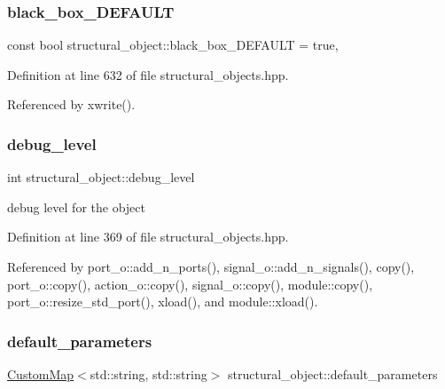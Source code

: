 \subsubsection{\texorpdfstring{black\+\_\+box\+\_\+\+D\+E\+F\+A\+U\+LT}{black\_box\_DEFAULT}}
{\footnotesize\ttfamily const bool structural\+\_\+object\+::black\+\_\+box\+\_\+\+D\+E\+F\+A\+U\+LT = true\hspace{0.3cm}{\ttfamily [static]}, {\ttfamily [private]}}



Definition at line 632 of file structural\+\_\+objects.\+hpp.



Referenced by xwrite().

\mbox{\label{classstructural__object_ac2744292aa7f0fca3742133d16bb3201}} 
\subsubsection{\texorpdfstring{debug\+\_\+level}{debug\_level}}
{\footnotesize\ttfamily int structural\+\_\+object\+::debug\+\_\+level\hspace{0.3cm}{\ttfamily [protected]}}



debug level for the object 



Definition at line 369 of file structural\+\_\+objects.\+hpp.



Referenced by port\+\_\+o\+::add\+\_\+n\+\_\+ports(), signal\+\_\+o\+::add\+\_\+n\+\_\+signals(), copy(), port\+\_\+o\+::copy(), action\+\_\+o\+::copy(), signal\+\_\+o\+::copy(), module\+::copy(), port\+\_\+o\+::resize\+\_\+std\+\_\+port(), xload(), and module\+::xload().

\mbox{\label{classstructural__object_ae34f6bc1b3949158817b7ae33fb93882}} 
\subsubsection{\texorpdfstring{default\+\_\+parameters}{default\_parameters}}
{\footnotesize\ttfamily \hyperlink{custom__map_8hpp_a18ca01763abbe3e5623223bfe5aaac6b}{Custom\+Map}$<$std\+::string, std\+::string$>$ structural\+\_\+object\+::default\+\_\+parameters\hspace{0.3cm}{\ttfamily [private]}}



